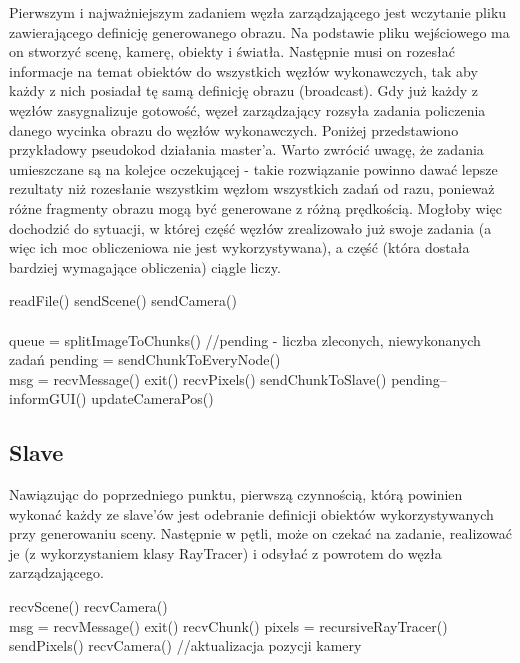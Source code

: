 Pierwszym i najważniejszym zadaniem węzła zarządzającego jest wczytanie pliku zawierającego definicję generowanego obrazu. Na podstawie pliku wejściowego ma on stworzyć scenę, kamerę, obiekty i światła. Następnie musi on rozesłać informacje na temat obiektów do wszystkich węzłów wykonawczych, tak aby każdy z nich posiadał tę samą definicję obrazu (broadcast). Gdy już każdy z węzłów zasygnalizuje gotowość, węzeł zarządzający rozsyła zadania policzenia danego wycinka obrazu do węzłów wykonawczych. Poniżej przedstawiono przykładowy pseudokod działania master'a. Warto zwrócić uwagę, że zadania umieszczane są na kolejce oczekującej - takie rozwiązanie powinno dawać lepsze rezultaty niż rozesłanie wszystkim węzłom wszystkich zadań od razu, ponieważ różne fragmenty obrazu mogą być generowane z różną prędkością. Mogłoby więc dochodzić do sytuacji, w której część węzłów zrealizowało już swoje zadania (a więc ich moc obliczeniowa nie jest wykorzystywana), a część (która dostała bardziej wymagające obliczenia) ciągle liczy.

\begin{algorithm}
\begin{algorithmic}
\State readFile()
\State sendScene()
\State sendCamera()
\\
\\
\State queue = splitImageToChunks()
\State //pending - liczba zleconych, niewykonanych zadań
\State pending = sendChunkToEveryNode()
\\
\State msg = recvMessage()
 exit()
	recvPixels()
		sendChunkToSlave()
	\Else
		pending--
	\EndIf
\EndIf
\EndWhile
\State informGUI()
\State updateCameraPos()
\EndWhile
\end{algorithmic}
\end{algorithm}


\subsection{Slave}

Nawiązując do poprzedniego punktu, pierwszą czynnością, którą powinien wykonać każdy ze slave'ów jest odebranie definicji obiektów wykorzystywanych przy generowaniu sceny. Następnie w pętli, może on czekać na zadanie, realizować je (z wykorzystaniem klasy RayTracer) i odsyłać z powrotem do węzła zarządzającego.

\begin{algorithm}
\begin{algorithmic}
\State recvScene()
\State recvCamera()
\\
\State msg = recvMessage()
 exit()
	recvChunk()
	pixels = recursiveRayTracer()
	sendPixels()
	recvCamera() //aktualizacja pozycji kamery
\EndIf
\EndWhile
\end{algorithmic}
\end{algorithm}


